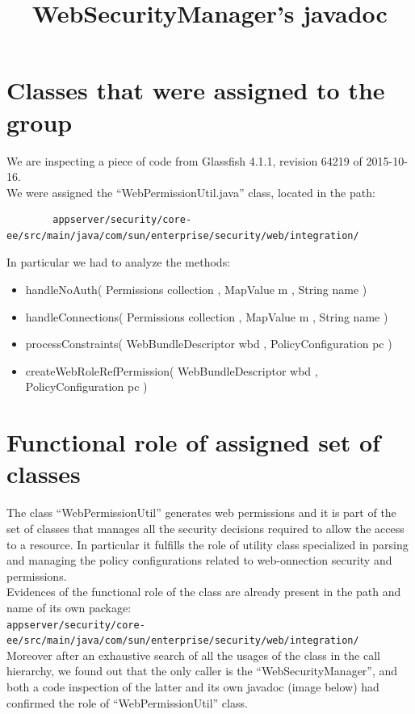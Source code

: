 \documentclass[a4paper,11pt]{report} %
\begin{document}
	\section{Classes that were assigned to the group} 
	We are inspecting a piece of code from Glassfish 4.1.1, revision 64219 of 2015-10-16.\\ \smallskip
	We were assigned the ``WebPermissionUtil.java'' class, located in the path:\
	\begin{verbatim}
		appserver/security/core-ee/src/main/java/com/sun/enterprise/security/web/integration/
	\end{verbatim}
	\bigskip
	In particular we had to analyze the methods:
	\begin{itemize}
		\item handleNoAuth( Permissions collection , MapValue m , String name )
		\item handleConnections( Permissions collection , MapValue m , String name )
		\item processConstraints( WebBundleDescriptor wbd , PolicyConfiguration pc )
		\item createWebRoleRefPermission( WebBundleDescriptor wbd , PolicyConfiguration pc )
	\end{itemize}
	
	\section{Functional role of assigned set of classes} 
	The class ``WebPermissionUtil'' generates web permissions and it is part of the set of classes that manages all the security decisions required to allow the access to a resource. In particular it fulfills the role of utility class specialized in parsing and managing the policy configurations related to web-onnection security and permissions.\\
	Evidences of the functional role of the class are already present in the path and name of its own package:\\
	\texttt{appserver/security/core-ee/src/main/java/com/sun/enterprise/security/web/integration/}\bigskip \\ 
	Moreover after an exhaustive search of all the usages of the class in the call hierarchy, we found out that the only caller is the ``WebSecurityManager'', and both a code inspection of the latter and its own javadoc (image below) had confirmed the role of ``WebPermissionUtil'' class.
	\begin{minipage}{\linewidth}
		\centering
		\title{WebSecurityManager's javadoc}\smallskip\\
	\end{minipage} \linebreak
	
\end{document}
